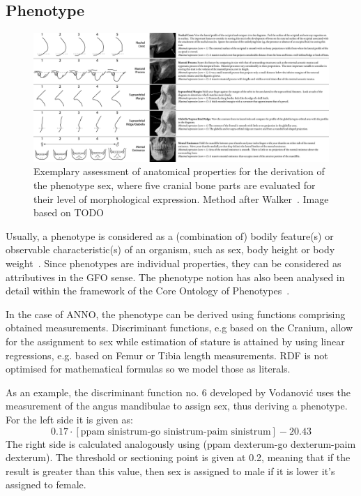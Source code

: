 \documentclass[sw]{iosart2x}
\begin{document}
\subsection{Phenotype}
\begin{figure}[h]
\includegraphics[width=\textwidth]{img/phenotype.png}
\caption{
Exemplary assessment of anatomical properties for the derivation of the phenotype sex, where five cranial bone parts are evaluated for their level of morphological expression.
Method after Walker~\cite{datacollection}.
Image based on TODO%
}\label{fig:gfo}
\end{figure}


Usually, a phenotype is considered as a (combination of) bodily feature(s) or observable characteristic(s) of an organism, such as sex, body height or body weight~\citep{ontologicaltreatment,phenomes,interoperability}.
Since phenotypes are individual properties, they can be considered as attributives in the GFO sense.
The phenotype notion has also been analysed in detail within the framework of the Core Ontology of Phenotypes~\citep{ontologicalrepresentation}.

In the case of ANNO, the phenotype can be derived using functions comprising obtained measurements.
Discriminant functions, e.g based on the Cranium, allow for the assignment to sex while estimation of stature is attained by using linear regressions, e.g. based on Femur or Tibia length measurements.
RDF is not optimised for mathematical formulas so we model those as literals.

As an example, the discriminant function no. 6 developed by Vodanović uses the measurement of the angus mandibulae to assign sex, thus deriving a phenotype.
For the left side it is given as:
\[
0.17 \cdot [\text{ppam sinistrum-go sinistrum-paim sinistrum}] - 20.43
\]
The right side is calculated analogously using (ppam dexterum-go dexterum-paim dexterum).
The threshold or sectioning point is given at 0.2, meaning that if the result is greater than this value, then sex is assigned to male if it is lower it’s assigned to female.
\end{document}
